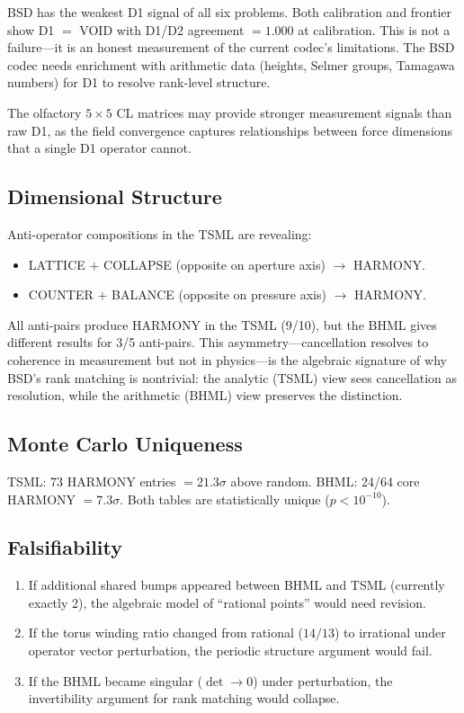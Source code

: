 \documentclass[11pt]{article}
\begin{document}
BSD has the weakest D1 signal of all six problems.  Both calibration and
frontier show D1 $=$ VOID with D1/D2 agreement $= 1.000$ at calibration.
This is not a failure---it is an honest measurement of the current codec's
limitations.  The BSD codec needs enrichment with arithmetic data (heights,
Selmer groups, Tamagawa numbers) for D1 to resolve rank-level structure.

The olfactory $5 \times 5$ CL matrices may provide stronger measurement
signals than raw D1, as the field convergence captures relationships between
force dimensions that a single D1 operator cannot.

\subsection{Dimensional Structure}

Anti-operator compositions in the TSML are revealing:
\begin{itemize}
  \item LATTICE $+$ COLLAPSE (opposite on aperture axis) $\to$ HARMONY.
  \item COUNTER $+$ BALANCE (opposite on pressure axis) $\to$ HARMONY.
\end{itemize}

\noindent
All anti-pairs produce HARMONY in the TSML (9/10), but the BHML gives
different results for 3/5 anti-pairs.  This asymmetry---cancellation resolves
to coherence in measurement but not in physics---is the algebraic signature of
why BSD's rank matching is nontrivial: the analytic (TSML) view sees
cancellation as resolution, while the arithmetic (BHML) view preserves the
distinction.

\subsection{Monte Carlo Uniqueness}

TSML: 73 HARMONY entries $= 21.3\sigma$ above random.  BHML: 24/64 core
HARMONY $= 7.3\sigma$.  Both tables are statistically unique
($p < 10^{-10}$).

\subsection{Falsifiability}

\begin{enumerate}
  \item If additional shared bumps appeared between BHML and TSML (currently
    exactly 2), the algebraic model of ``rational points'' would need revision.
  \item If the torus winding ratio changed from rational ($14/13$) to
    irrational under operator vector perturbation, the periodic structure
    argument would fail.
  \item If the BHML became singular ($\det \to 0$) under perturbation, the
    invertibility argument for rank matching would collapse.
\end{enumerate}
\end{document}
